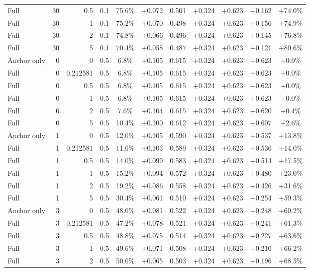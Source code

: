 \begin{table}[htbp]
\begin{tabular}{lrrrccccccc}
Full & 30 & 0.5 & 0.1 & 75.6\% & +0.072 & 0.501 & +0.324 & +0.623 & +0.162 & +74.0\% \\
Full & 30 & 1 & 0.1 & 75.2\% & +0.070 & 0.498 & +0.324 & +0.623 & +0.156 & +74.9\% \\
Full & 30 & 2 & 0.1 & 74.8\% & +0.066 & 0.496 & +0.324 & +0.623 & +0.145 & +76.8\% \\
Full & 30 & 5 & 0.1 & 70.4\% & +0.058 & 0.487 & +0.324 & +0.623 & +0.121 & +80.6\% \\
Anchor only & 0 & 0 & 0.5 & 6.8\% & +0.105 & 0.615 & +0.324 & +0.623 & +0.623 & +0.0\% \\
Full & 0 & 0.212581 & 0.5 & 6.8\% & +0.105 & 0.615 & +0.324 & +0.623 & +0.623 & +0.0\% \\
Full & 0 & 0.5 & 0.5 & 6.8\% & +0.105 & 0.615 & +0.324 & +0.623 & +0.623 & +0.0\% \\
Full & 0 & 1 & 0.5 & 6.8\% & +0.105 & 0.615 & +0.324 & +0.623 & +0.623 & +0.0\% \\
Full & 0 & 2 & 0.5 & 7.6\% & +0.104 & 0.615 & +0.324 & +0.623 & +0.620 & +0.4\% \\
Full & 0 & 5 & 0.5 & 10.4\% & +0.100 & 0.612 & +0.324 & +0.623 & +0.607 & +2.6\% \\
Anchor only & 1 & 0 & 0.5 & 12.0\% & +0.105 & 0.590 & +0.324 & +0.623 & +0.537 & +13.8\% \\
Full & 1 & 0.212581 & 0.5 & 11.6\% & +0.103 & 0.589 & +0.324 & +0.623 & +0.536 & +14.0\% \\
Full & 1 & 0.5 & 0.5 & 14.0\% & +0.099 & 0.583 & +0.324 & +0.623 & +0.514 & +17.5\% \\
Full & 1 & 1 & 0.5 & 15.2\% & +0.094 & 0.572 & +0.324 & +0.623 & +0.480 & +23.0\% \\
Full & 1 & 2 & 0.5 & 19.2\% & +0.086 & 0.558 & +0.324 & +0.623 & +0.426 & +31.6\% \\
Full & 1 & 5 & 0.5 & 30.4\% & +0.061 & 0.510 & +0.324 & +0.623 & +0.254 & +59.3\% \\
Anchor only & 3 & 0 & 0.5 & 48.0\% & +0.081 & 0.522 & +0.324 & +0.623 & +0.248 & +60.2\% \\
Full & 3 & 0.212581 & 0.5 & 47.2\% & +0.078 & 0.521 & +0.324 & +0.623 & +0.241 & +61.3\% \\
Full & 3 & 0.5 & 0.5 & 48.8\% & +0.075 & 0.514 & +0.324 & +0.623 & +0.227 & +63.6\% \\
Full & 3 & 1 & 0.5 & 49.6\% & +0.071 & 0.508 & +0.324 & +0.623 & +0.210 & +66.2\% \\
Full & 3 & 2 & 0.5 & 50.0\% & +0.065 & 0.503 & +0.324 & +0.623 & +0.196 & +68.5\% \\

\end{tabular}
\end{table}
